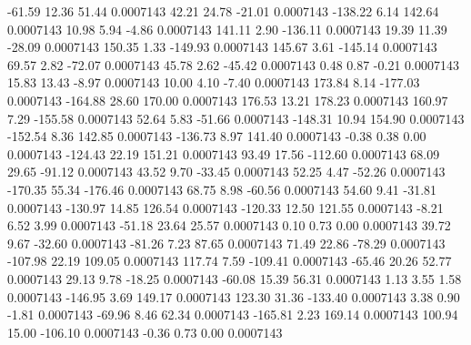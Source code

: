       -61.59       12.36       51.44     0.0007143
       42.21       24.78      -21.01     0.0007143
     -138.22        6.14      142.64     0.0007143
       10.98        5.94       -4.86     0.0007143
      141.11        2.90     -136.11     0.0007143
       19.39       11.39      -28.09     0.0007143
      150.35        1.33     -149.93     0.0007143
      145.67        3.61     -145.14     0.0007143
       69.57        2.82      -72.07     0.0007143
       45.78        2.62      -45.42     0.0007143
        0.48        0.87       -0.21     0.0007143
       15.83       13.43       -8.97     0.0007143
       10.00        4.10       -7.40     0.0007143
      173.84        8.14     -177.03     0.0007143
     -164.88       28.60      170.00     0.0007143
      176.53       13.21      178.23     0.0007143
      160.97        7.29     -155.58     0.0007143
       52.64        5.83      -51.66     0.0007143
     -148.31       10.94      154.90     0.0007143
     -152.54        8.36      142.85     0.0007143
     -136.73        8.97      141.40     0.0007143
       -0.38        0.38        0.00     0.0007143
     -124.43       22.19      151.21     0.0007143
       93.49       17.56     -112.60     0.0007143
       68.09       29.65      -91.12     0.0007143
       43.52        9.70      -33.45     0.0007143
       52.25        4.47      -52.26     0.0007143
     -170.35       55.34     -176.46     0.0007143
       68.75        8.98      -60.56     0.0007143
       54.60        9.41      -31.81     0.0007143
     -130.97       14.85      126.54     0.0007143
     -120.33       12.50      121.55     0.0007143
       -8.21        6.52        3.99     0.0007143
      -51.18       23.64       25.57     0.0007143
        0.10        0.73        0.00     0.0007143
       39.72        9.67      -32.60     0.0007143
      -81.26        7.23       87.65     0.0007143
       71.49       22.86      -78.29     0.0007143
     -107.98       22.19      109.05     0.0007143
      117.74        7.59     -109.41     0.0007143
      -65.46       20.26       52.77     0.0007143
       29.13        9.78      -18.25     0.0007143
      -60.08       15.39       56.31     0.0007143
        1.13        3.55        1.58     0.0007143
     -146.95        3.69      149.17     0.0007143
      123.30       31.36     -133.40     0.0007143
        3.38        0.90       -1.81     0.0007143
      -69.96        8.46       62.34     0.0007143
     -165.81        2.23      169.14     0.0007143
      100.94       15.00     -106.10     0.0007143
       -0.36        0.73        0.00     0.0007143
